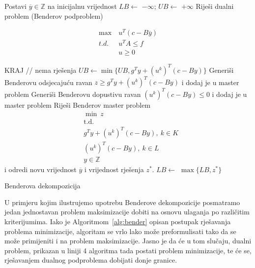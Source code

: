 \documentclass[a4paper, utf8, 11pt, colorlinks]{book}
\theoremstyle{definition}
\begin{document}
 \begin{algorithm}[H] \label{alg:bender}
 	\begin{algorithmic}[1] 
 		\STATE Postavi $\overline{y}\in\mathbb{Z}$ na inicijalnu vrijednost
 		\STATE 	$LB \gets$ $-\infty$; $UB \gets$ $+\infty$
 		\STATE Riješi dualni problem (Benderov podproblem)
 		
 		$$	\begin{aligned}
 			\max\ &u^T (c-B\overline{y})\\
 			t.d.\ &u^TA\leqslant f\\
 			&u\geqslant 0
 			\end{aligned}$$
 		
 		\STATE  KRAJ // nema  rješenja  
 		\ENDIF
 		\STATE $UB \gets \min\{UB,g^Ty+(u^k)^T(c-By)\}$
 		\STATE Generiši Benderovu odsjecajuću ravan $z\geqslant g^Ty+(u^k)^T(c-By)$ i dodaj je u master problem
 		\ENDIF
		\STATE Generiši Benderovu dopustivu ravan 	$(u^k)^T(c-By)\leqslant 0$ i dodaj je u master problem
		\ENDIF
		\STATE Riješi Benderov master problem
			$$\begin{aligned}
			&\min\ z\\
			&\mbox{t.d.}\\
			& g^Ty+(u^k)^T(c-By), \ k \in K\\
			& (u^k)^T(c-By), \ k \in L\\
			&y \in \mathbb{Z}
		\end{aligned}$$
			i odredi novu vrijednost $\overline{y}$ i vrijednost rješenja $z^*$.
		\STATE $LB \gets$ $\max\{LB,z^*\}$
 		\ENDWHILE
 	\end{algorithmic}
 	\caption{Benderova dekompozicija}\label{alg:bender}
 \end{algorithm}



U primjeru kojim ilustrujemo upotrebu Benderove dekompozicije posmatramo jedan jednostavan problem maksimizacije dobiti na osnovu ulaganja po različitim kriterijumima.
Iako je Algoritmom~\ref{alg:bender} opisan postupak rješavanja problema minimizacije, algoritam se vrlo lako može preformulisati tako da se može primijeniti i na problem maksimizacije. Jasno je da će u tom slučaju, dualni problem, prikazan u liniji 4 algoritma tada postati problem minimizacije, te će se, rješavanjem dualnog podproblema dobijati donje granice.
\end{document}
